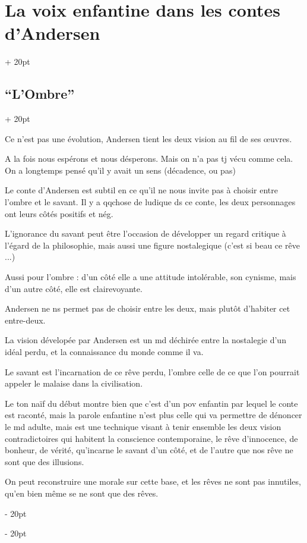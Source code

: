 \documentclass[a4paper, 12pt, twoside]{article}
\newcommand{\ind}[1][20pt]{\advance\leftskip + #1}
\newcommand{\deind}[1][20pt]{\advance\leftskip - #1}
\newenvironment{indt}[2][20pt]{#2 \par \ind[#1]}{\par \deind} %
\begin{document}
\begin{indt}{\section{La voix enfantine dans les contes d'Andersen}}
\begin{indt}{\subsection{``L'Ombre''}}
            \vspace{12pt}
            
            Ce n'est pas une évolution, Andersen tient les deux vision au fil de ses \oe uvres.
            
            A la fois nous espérons et nous désperons. Mais on n'a pas tj vécu comme cela. On a longtemps pensé qu'il y avait un sens (décadence, ou pas)
            
            Le conte d'Andersen est subtil en ce qu'il ne nous invite pas à choisir entre l'ombre et le savant. Il y a qqchose de ludique ds ce conte, les deux personnages ont leurs côtés positifs et nég.
            
            L'ignorance du savant peut être l'occasion de développer un regard critique à l'égard de la philosophie, mais aussi une figure nostalegique (c'est si beau ce rêve ...)
            
            Aussi pour l'ombre : d'un côté elle a une attitude intolérable, son cynisme, mais d'un autre côté, elle est clairevoyante.
            
            Andersen ne ns permet pas de choisir entre les deux, mais plutôt d'habiter cet entre-deux.
            
            La vision dévelopée par Andersen est un md déchirée entre la nostalegie d'un idéal perdu, et la connaissance du monde comme il va.
            
            Le savant est l'incarnation de ce rêve perdu, l'ombre celle de ce que l'on pourrait appeler le malaise dans la civilisation.
            
            \vspace{12pt}
            
            Le ton naïf du début montre bien que c'est d'un pov enfantin par lequel le conte est raconté, mais la parole enfantine n'est plus celle qui va permettre de dénoncer le md adulte, mais est une technique visant à tenir ensemble les deux vision contradictoires qui habitent la conscience contemporaine, le rêve d'innocence, de bonheur, de vérité, qu'incarne le savant d'un côté, et de l'autre que nos rêve ne sont que des illusions.
            
            On peut reconstruire une morale sur cette base, et les rêves ne sont pas innutiles, qu'en bien même se ne sont que des rêves.
        \end{indt}
    \end{indt}
    
\end{document}
